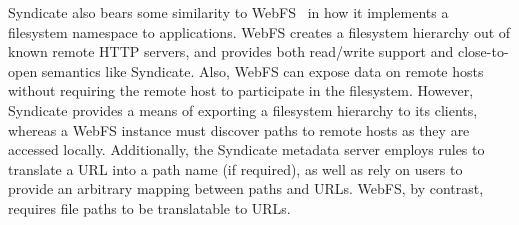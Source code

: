 Syndicate also bears some similarity to WebFS~\cite{webfs} in how it implements a filesystem namespace to applications.
WebFS creates a filesystem hierarchy out of known remote HTTP servers, and provides both read/write 
support and close-to-open semantics like Syndicate.  Also, WebFS can expose data on
remote hosts without requiring the remote host to participate in the filesystem.  However, Syndicate
provides a means of exporting a filesystem hierarchy to its clients, whereas a WebFS instance must
discover paths to remote hosts as they are accessed locally.  Additionally, the Syndicate metadata server
employs rules to translate a URL into a path name (if required), as well as rely on users
to provide an arbitrary mapping between paths and URLs.  WebFS, by contrast, requires file paths to be translatable to URLs.


